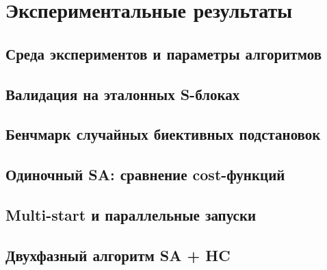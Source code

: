 \newpage
\section{Экспериментальные результаты}


\subsection{Среда экспериментов и параметры алгоритмов}

\subsection{Валидация на эталонных S-блоках}

\subsection{Бенчмарк случайных биективных подстановок}

\subsection{Одиночный SA: сравнение cost-функций}

\subsection{Multi-start и параллельные запуски}

\subsection{Двухфазный алгоритм SA + HC}

